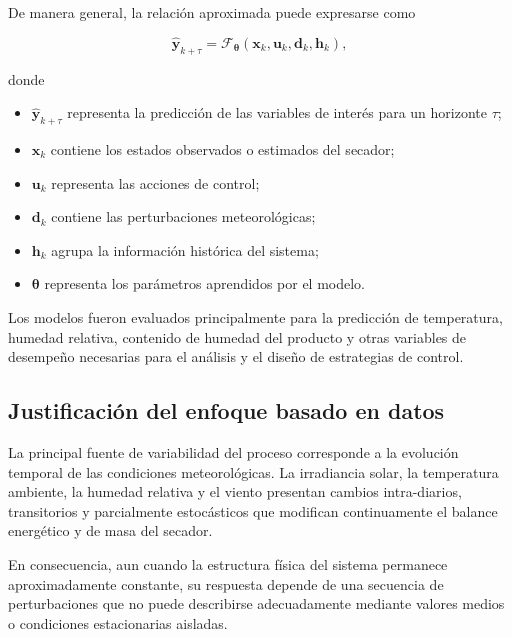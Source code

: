 De manera general, la relación aproximada puede expresarse como

\begin{equation}
\hat{\mathbf{y}}_{k+\tau}
=
\mathcal{F}_{\boldsymbol{\theta}}
\left(
\mathbf{x}_{k},
\mathbf{u}_{k},
\mathbf{d}_{k},
\mathbf{h}_{k}
\right),
\label{eq:modelo_data_driven_general}
\end{equation}

donde

\begin{itemize}
    \item $\hat{\mathbf{y}}_{k+\tau}$ representa la predicción de las variables de interés para un horizonte $\tau$;
    \item $\mathbf{x}_{k}$ contiene los estados observados o estimados del secador;
    \item $\mathbf{u}_{k}$ representa las acciones de control;
    \item $\mathbf{d}_{k}$ contiene las perturbaciones meteorológicas;
    \item $\mathbf{h}_{k}$ agrupa la información histórica del sistema;
    \item $\boldsymbol{\theta}$ representa los parámetros aprendidos por el modelo.
\end{itemize}

Los modelos fueron evaluados principalmente para la predicción de temperatura, humedad relativa, contenido de humedad del producto y otras variables de desempeño necesarias para el análisis y el diseño de estrategias de control.

\subsection{Justificación del enfoque basado en datos}
\label{subsec:justificacion_data_driven}

La principal fuente de variabilidad del proceso corresponde a la evolución temporal de las condiciones meteorológicas. La irradiancia solar, la temperatura ambiente, la humedad relativa y el viento presentan cambios intra-diarios, transitorios y parcialmente estocásticos que modifican continuamente el balance energético y de masa del secador.

En consecuencia, aun cuando la estructura física del sistema permanece aproximadamente constante, su respuesta depende de una secuencia de perturbaciones que no puede describirse adecuadamente mediante valores medios o condiciones estacionarias aisladas.

